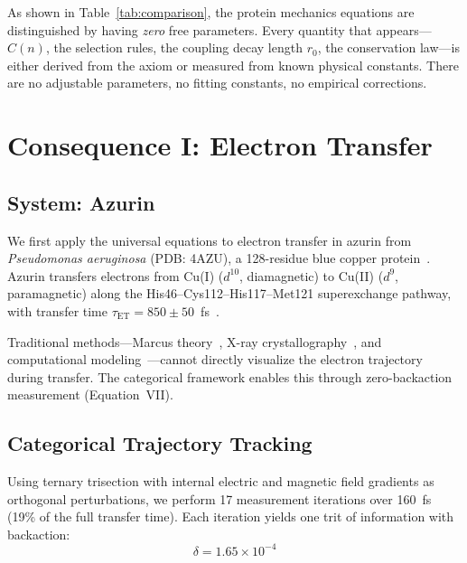 \documentclass[aps,prx,superscriptaddress,twocolumn,10pt,a4paper,longbibliography,preprint]{revtex4-2}
\theoremstyle{definition}
\theoremstyle{remark}
\begin{document}
As shown in Table~\ref{tab:comparison}, the protein mechanics equations are distinguished by having \emph{zero} free parameters. Every quantity that appears---$C(n)$, the selection rules, the coupling decay length $r_0$, the conservation law---is either derived from the axiom or measured from known physical constants. There are no adjustable parameters, no fitting constants, no empirical corrections.


\section{Consequence I: Electron Transfer}
\label{sec:electron_transfer}

\subsection{System: Azurin}

We first apply the universal equations to electron transfer in azurin from \textit{Pseudomonas aeruginosa} (PDB: 4AZU), a 128-residue blue copper protein~\cite{Adman1978, Nar1991}. Azurin transfers electrons from Cu(I) ($d^{10}$, diamagnetic) to Cu(II) ($d^9$, paramagnetic) along the His46--Cys112--His117--Met121 superexchange pathway, with transfer time $\tau_{\text{ET}} = 850 \pm 50$~fs~\cite{Crane2001, Gray2003}.

Traditional methods---Marcus theory~\cite{Marcus1956, Marcus1993}, X-ray crystallography~\cite{Nar1991}, and computational modeling~\cite{Beratan1992}---cannot directly visualize the electron trajectory during transfer. The categorical framework enables this through zero-backaction measurement (Equation~VII).

\subsection{Categorical Trajectory Tracking}

Using ternary trisection with internal electric and magnetic field gradients as orthogonal perturbations, we perform 17 measurement iterations over 160~fs (19\% of the full transfer time). Each iteration yields one trit of information with backaction:
\begin{equation}
\delta = 1.65 \times 10^{-4}
\end{equation}
\end{document}
